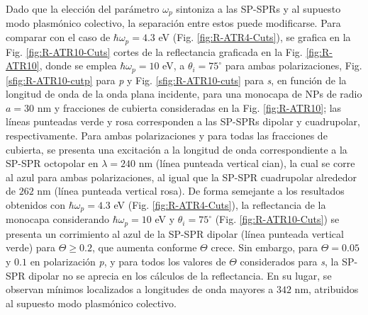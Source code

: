 Dado que la elección del parámetro $\omega_p$ sintoniza a las SP-SPRs y al supuesto modo plasmónico colectivo, la separación entre estos puede modificarse. Para comparar con el caso de $\hbar\omega_p=4.3$ eV (Fig. \ref{fig:R-ATR4-Cuts}), se grafica en la Fig. \ref{fig:R-ATR10-Cuts} cortes de la reflectancia graficada en la Fig. \ref{fig:R-ATR10}, donde se emplea $\hbar\omega_p = 10$ eV, a $\theta_i = 75^\circ$ para ambas polarizaciones,  Fig. \ref{sfig:R-ATR10-cutp} para \emph{p} y Fig. \ref{sfig:R-ATR10-cuts} para \emph{s}, en  función de la longitud de onda de la onda plana incidente, para una monocapa de NPs de radio $a= 30$ nm  y fracciones de cubierta consideradas en la Fig. \ref{fig:R-ATR10}; las líneas punteadas verde y rosa  corresponden a las SP-SPRs dipolar y cuadrupolar, respectivamente. Para ambas polarizaciones y para todas las fracciones de cubierta, se presenta una excitación a la longitud de onda correspondiente a la SP-SPR octopolar en $\lambda=240$ nm (línea punteada vertical cian), la cual se corre al azul para ambas polarizaciones, al igual que  la SP-SPR cuadrupolar alrededor de $262$ nm (línea punteada vertical rosa). De forma semejante a los resultados obtenidos con $\hbar\omega_p = 4.3$ eV (Fig. \ref{fig:R-ATR4-Cuts}), la reflectancia de la monocapa considerando $\hbar\omega_p=10$ eV y $\theta_i=75^\circ$ (Fig. \ref{fig:R-ATR10-Cuts}) se presenta un corrimiento al azul de la SP-SPR dipolar (línea punteada vertical verde) para $\Theta\geq 0.2$, que aumenta conforme $\Theta$ crece. Sin embargo, para $\Theta=0.05$ y $0.1$ en polarización \emph{p}, y para todos los valores de $\Theta$ considerados para \emph{s}, la SP-SPR dipolar no se aprecia en los cálculos de la reflectancia. En su lugar, se observan mínimos  localizados a longitudes de onda mayores a $342$ nm, atribuidos al supuesto modo plasmónico colectivo.

